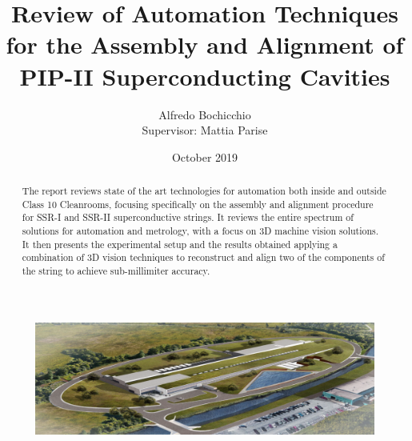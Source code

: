 \documentclass[12pt,a4paper]{article}
\title{Review of Automation Techniques for the Assembly and Alignment of PIP-II Superconducting Cavities}
\author{Alfredo Bochicchio \\ Supervisor: Mattia Parise}
\date{October 2019}
\begin{document}
\maketitle


\begin{abstract}
\newline
    The report reviews state of the art technologies for automation both inside and outside Class 10 Cleanrooms, focusing specifically on the assembly and alignment procedure for SSR-I and SSR-II superconductive strings. \newline It reviews the entire spectrum of solutions for automation and metrology, with a focus on 3D machine vision solutions. It then presents the experimental setup and the results obtained applying a combination of 3D vision techniques to reconstruct and align two of the components of the string to achieve sub-millimiter accuracy. 
\end{abstract}
\begin{figure}[h!]
\centering
\includegraphics[width=1\textwidth]{1.png}
\end{figure}

\newpage
\end{document}

